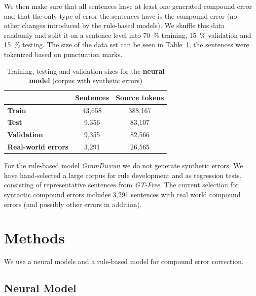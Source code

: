 \documentclass[postprint]{flammie}
\begin{document}
We then make sure that all sentences have at least one generated compound error
and that the only type of error the sentences have is the compound error (no
other changes introduced by the rule-based models). We shuffle this data
randomly and split it on a sentence level into 70~\% training, 15~\% validation
and 15~\% testing. The size of the data set can be seen in
Table~\ref{tab:data-stats}, the sentences were tokenized based on punctuation
marks.

\begin{table}[htb]
\centering \small
\begin{tabular}{lcc}
\toprule
           & \textbf{Sentences} & \textbf{Source tokens} \\ \midrule
\textbf{Train}      & 43,658    & 388,167       \\
\textbf{Test}       & 9,356     & 83,107        \\
\textbf{Validation} & 9,355     & 82,566        \\
\midrule
\textbf{Real-world errors} & 3,291 & 26,565 \\
\bottomrule
\end{tabular}
\caption{Training, testing and validation sizes for the \textbf{neural model}
    (corpus with synthetic errors)\label{tab:data-stats}}
\end{table}

For the rule-based model \textit{GramDivvun} we do not generate synthetic
errors. We have hand-selected a large corpus for rule development and as
regression tests, consisting of representative sentences from \textit{GT-Free}.
The current selection for syntactic compound errors includes 3,291 sentences
with real world compound errors (and possibly other errors in addition).

\section{Methods}

We use a neural models and a rule-based model for compound error  correction.

\subsection{Neural Model}
\end{document}
